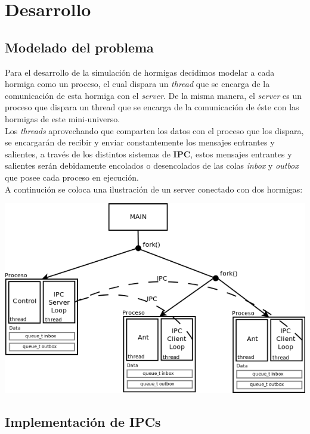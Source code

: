 \documentclass[a4paper,10pt]{article}
\begin{document}
\newpage

\section{Desarrollo}
\subsection{Modelado del problema}
Para el desarrollo de la simulación de hormigas decidimos modelar a cada hormiga como un proceso, el cual dispara un \textit{thread} que se
encarga de la comunicación de esta hormiga con el \textit{server}. De la misma manera, el \textit{server} es un proceso que dispara un thread
que se encarga de la comunicación de éste con las hormigas de este mini-universo.\\
Los \textit{threads} aprovechando que comparten los datos con el proceso que los dispara, se encargarán de recibir y enviar constantemente los 
mensajes entrantes y salientes, a través de los distintos sistemas de \textbf{IPC}, estos mensajes entrantes y salientes serán debidamente
encolados o desencolados de las colas \textit{inbox} y \textit{outbox} que posee cada proceso en ejecución.\\
A continución se coloca una ilustración de un server conectado con dos hormigas:

\begin{center}
 \includegraphics[scale=0.65]{./so1.png}
\end{center}

\newpage
\subsection{Implementación de IPCs}
\end{document}
